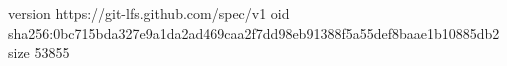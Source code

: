 version https://git-lfs.github.com/spec/v1
oid sha256:0bc715bda327e9a1da2ad469caa2f7dd98eb91388f5a55def8baae1b10885db2
size 53855
